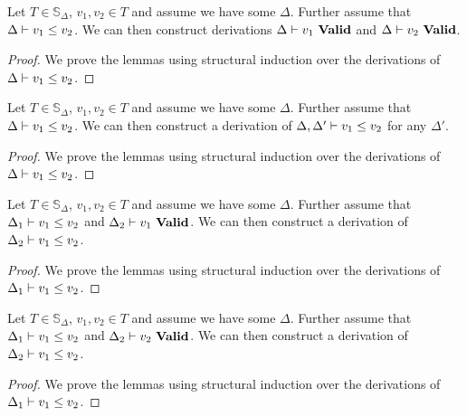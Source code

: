 \begin{lemma}
  Let $T \in \mathbb{S}_\Delta$, $v_1, v_2 \in T$ and assume we have some
  $\Delta$. Further assume that ${\Delta} |- {v_1} \le {v_2}$. We can then
  construct derivations ${\Delta} |- {v_1}\ \mathbf{Valid}$ and ${\Delta} |- {v_2}\ \mathbf{Valid}$.
\end{lemma}
\begin{proof}
  We prove the lemmas using structural induction over the derivations of
  ${\Delta} |- {v_1} \le {v_2}$.
\end{proof}

\begin{lemma}
  Let $T \in \mathbb{S}_\Delta$, $v_1, v_2 \in T$ and assume we have some
  $\Delta$. Further assume that ${\Delta} |- {v_1} \le {v_2}$. We can then
  construct a derivation of ${\Delta,\Delta'} |- {v_1} \le {v_2}$ for any $\Delta'$.
\end{lemma}
\begin{proof}
  We prove the lemmas using structural induction over the derivations of
  ${\Delta} |- {v_1} \le {v_2}$.
\end{proof}

\begin{lemma}
  Let $T \in \mathbb{S}_\Delta$, $v_1, v_2 \in T$ and assume we have some
  $\Delta$. Further assume that ${\Delta_1} |- {v_1} \le {v_2}$ and
  ${\Delta_2} |- {v_1}\ \mathbf{Valid}$. We can then construct a derivation of
  ${\Delta_2} |- {v_1} \le {v_2}$.
\end{lemma}
\begin{proof}
  We prove the lemmas using structural induction over the derivations of
  ${\Delta_1} |- {v_1} \le {v_2}$.
\end{proof}

\begin{lemma}
  Let $T \in \mathbb{S}_\Delta$, $v_1, v_2 \in T$ and assume we have some
  $\Delta$. Further assume that ${\Delta_1} |- {v_1} \le {v_2}$ and
  ${\Delta_2} |- {v_2}\ \mathbf{Valid}$. We can then construct a derivation of
  ${\Delta_2} |- {v_1} \le {v_2}$.
\end{lemma}
\begin{proof}
  We prove the lemmas using structural induction over the derivations of
  ${\Delta_1} |- {v_1} \le {v_2}$.
\end{proof}
